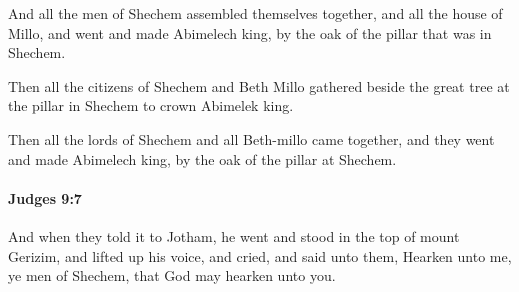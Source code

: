 			\begin{versebox}
					\item[BHS] 
					\item[ASV] And all the men of Shechem assembled themselves together, and all the house of Millo, and went and made Abimelech king, by the oak of the pillar that was in Shechem.
					\item[NIV] Then all the citizens of Shechem and Beth Millo gathered beside the great tree at the pillar in Shechem to crown Abimelek king.
					\item[NRSV] Then all the lords of Shechem and all Beth-millo came together, and they went and made Abimelech king, by the oak of the pillar at Shechem.
			\end{versebox}

		\paragraph{Judges 9:7} %
			\label{JUDGES-9-7}

			And when they told it to Jotham, he went and stood in the top of mount Gerizim, and lifted up his voice, and cried, and said unto them, Hearken unto me, ye men of Shechem, that God may hearken unto you.

